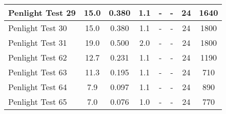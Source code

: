 \begin{table}[!ht]
\begin{center}
\begin{tabular}{|l|c|c|c|c|c|c|c|}
Penlight Test 29  &  15.0      &  0.380        &  1.1        &  -         &  -          &  24           &  1640         \\ \hline
Penlight Test 30  &  15.0      &  0.380        &  1.1        &  -         &  -          &  24           &  1800         \\ \hline
Penlight Test 31  &  19.0      &  0.500        &  2.0        &  -         &  -          &  24           &  1800         \\ \hline
Penlight Test 62  &  12.7      &  0.231        &  1.1        &  -         &  -          &  24           &  1190         \\ \hline
Penlight Test 63  &  11.3      &  0.195        &  1.1        &  -         &  -          &  24           &  710          \\ \hline
Penlight Test 64  &   7.9      &  0.097        &  1.1        &  -         &  -          &  24           &  890          \\ \hline
Penlight Test 65  &   7.0      &  0.076        &  1.0        &  -         &  -          &  24           &  770          \\ \hline
\end{tabular}
\end{center}
\end{table}


\clearpage


